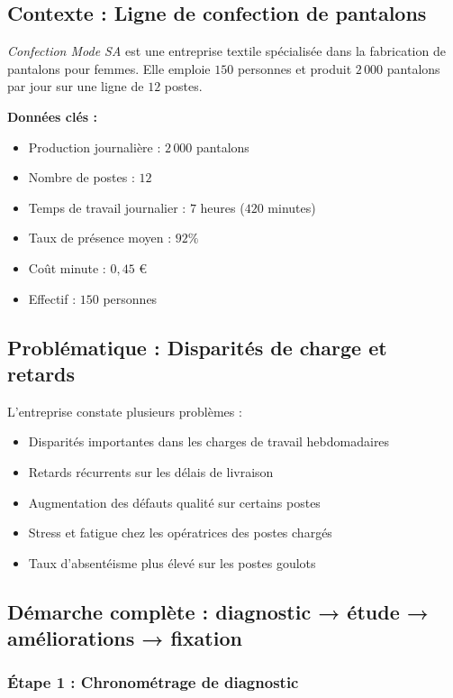 \documentclass[a4paper,12pt]{article}
\begin{document}
\subsection{Contexte : Ligne de confection de pantalons}

\textit{Confection Mode SA} est une entreprise textile spécialisée dans la fabrication de pantalons pour femmes. Elle emploie $150$ personnes et produit $2\,000$ pantalons par jour sur une ligne de $12$ postes.

\textbf{Données clés :}
\begin{itemize}
    \item Production journalière : $2\,000$ pantalons
    \item Nombre de postes : $12$
    \item Temps de travail journalier : $7$ heures ($420$ minutes)
    \item Taux de présence moyen : $92\%$
    \item Coût minute : $0,45$ €
    \item Effectif : $150$ personnes
\end{itemize}

\subsection{Problématique : Disparités de charge et retards}

L'entreprise constate plusieurs problèmes :
\begin{itemize}
    \item Disparités importantes dans les charges de travail hebdomadaires
    \item Retards récurrents sur les délais de livraison
    \item Augmentation des défauts qualité sur certains postes
    \item Stress et fatigue chez les opératrices des postes chargés
    \item Taux d'absentéisme plus élevé sur les postes goulots
\end{itemize}

\subsection{Démarche complète : diagnostic → étude → améliorations → fixation}

\subsubsection{Étape 1 : Chronométrage de diagnostic}
\end{document}
